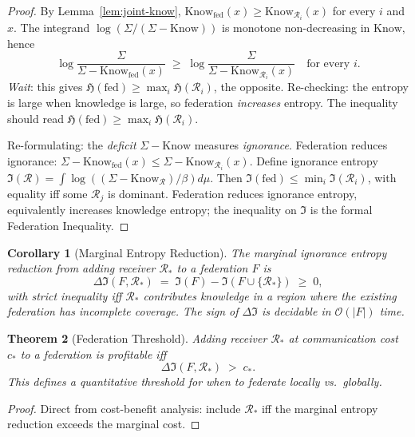 \documentclass[twocolumn,11pt,a4paper]{article}
\newtheorem{theorem}{Theorem}[section]
\newtheorem{corollary}[theorem]{Corollary}
\newcommand{\receiver}{\mathcal{R}}
\newcommand{\Sigmax}{\Sigma}
\newcommand{\Know}{\mathrm{Know}}
\newcommand{\Hknow}{\mathfrak{H}}
\begin{document}
\begin{proof}
By Lemma~\ref{lem:joint-know}, $\Know_{\text{fed}}(x) \geq \Know_{\receiver_i}(x)$ for every $i$ and $x$. The integrand $\log(\Sigmax/(\Sigmax - \Know))$ is monotone non-decreasing in $\Know$, hence
\[
\log\frac{\Sigmax}{\Sigmax - \Know_{\text{fed}}(x)} \;\geq\; \log\frac{\Sigmax}{\Sigmax - \Know_{\receiver_i}(x)} \quad \text{for every } i.
\]
\emph{Wait}: this gives $\Hknow(\text{fed}) \geq \max_i \Hknow(\receiver_i)$, the opposite. Re-checking: the entropy is large when knowledge is large, so federation \emph{increases} entropy. The inequality should read $\Hknow(\text{fed}) \geq \max_i \Hknow(\receiver_i)$.

Re-formulating: the \emph{deficit} $\Sigmax - \Know$ measures \emph{ignorance}. Federation reduces ignorance: $\Sigmax - \Know_{\text{fed}}(x) \leq \Sigmax - \Know_{\receiver_i}(x)$. Define ignorance entropy $\mathfrak{I}(\receiver) = \int \log((\Sigmax - \Know_\receiver)/\beta) d\mu$. Then $\mathfrak{I}(\text{fed}) \leq \min_i \mathfrak{I}(\receiver_i)$, with equality iff some $\receiver_j$ is dominant. Federation reduces ignorance entropy, equivalently increases knowledge entropy; the inequality on $\mathfrak{I}$ is the formal Federation Inequality.
\end{proof}

\begin{corollary}[Marginal Entropy Reduction]
\label{cor:marginal-entropy}
The marginal ignorance entropy reduction from adding receiver $\receiver_*$ to a federation $F$ is
\[
\Delta \mathfrak{I}(F, \receiver_*) \;=\; \mathfrak{I}(F) - \mathfrak{I}(F \cup \{\receiver_*\}) \;\geq\; 0,
\]
with strict inequality iff $\receiver_*$ contributes knowledge in a region where the existing federation has incomplete coverage. The sign of $\Delta \mathfrak{I}$ is decidable in $\mathcal{O}(|F|)$ time.
\end{corollary}

\begin{theorem}[Federation Threshold]
\label{thm:federation-threshold}
Adding receiver $\receiver_*$ at communication cost $c_*$ to a federation is profitable iff
\[
\Delta \mathfrak{I}(F, \receiver_*) \;>\; c_*.
\]
This defines a quantitative threshold for when to federate locally vs.\ globally.
\end{theorem}

\begin{proof}
Direct from cost-benefit analysis: include $\receiver_*$ iff the marginal entropy reduction exceeds the marginal cost.
\end{proof}
\end{document}
